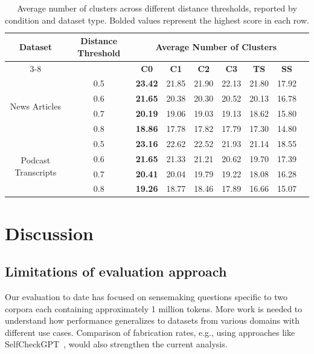 \documentclass{article}
\begin{document}
\begin{table}
\centering
\caption{Average number of clusters across different distance thresholds, reported by condition and dataset type. Bolded values represent the highest score in each row.}
\begin{tabular}{c c ccccccc}
    \toprule
\multirow{2}{*}{\textbf{Dataset}} & \multirow{2}{*}{\textbf{Distance Threshold}} & \multicolumn{6}{c}{\textbf{Average Number of Clusters}} \\ 
    \cmidrule(lr){3-8}
 &  & \textbf{C0} & \textbf{C1} & \textbf{C2} & \textbf{C3} & \textbf{TS} & \textbf{SS} \\ 
    \midrule
\multirow{4}{*}{News Articles} & 0.5 & \textbf{23.42} & 21.85 & 21.90 & 22.13 & 21.80 & 17.92 \\
                          & 0.6 & \textbf{21.65} & 20.38 & 20.30 & 20.52 & 20.13 & 16.78 \\
                          & 0.7 & \textbf{20.19} & 19.06 & 19.03 & 19.13 & 18.62 & 15.80 \\
                          & 0.8 & \textbf{18.86} & 17.78 & 17.82 & 17.79 & 17.30 & 14.80 \\
\midrule
\multirow{4}{*}{Podcast Transcripts}  & 0.5 & \textbf{23.16} & 22.62 & 22.52 & 21.93 & 21.14 & 18.55 \\
                          & 0.6 & \textbf{21.65} & 21.33 & 21.21 & 20.62 & 19.70 & 17.39 \\
                          & 0.7 & \textbf{20.41} & 20.04 & 19.79 & 19.22 & 18.08 & 16.28 \\
                          & 0.8 & \textbf{19.26} & 18.77 & 18.46 & 17.89 & 16.66 & 15.07 \\
    \bottomrule
\end{tabular}
\label{tab:claim_div}
\end{table}


\section{Discussion}

\subsection{Limitations of evaluation approach}
Our evaluation to date has focused on sensemaking questions specific to two corpora each containing approximately 1 million tokens.
More work is needed to understand how performance generalizes to datasets from various domains with different use cases.
Comparison of fabrication rates, e.g., using approaches like SelfCheckGPT~\citep{manakul2023selfcheckgpt}, would also strengthen the current analysis.
\end{document}
